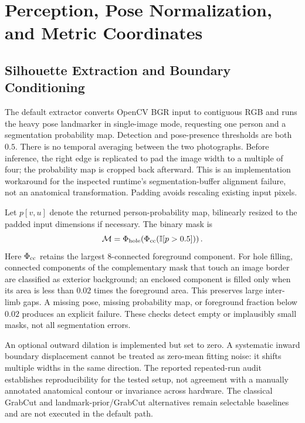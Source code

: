 \documentclass[11pt,a4paper]{article}
\numberwithin{equation}{section}
\begin{document}
\section{Perception, Pose Normalization, and Metric Coordinates}
\subsection{Silhouette Extraction and Boundary Conditioning}
\label{subsec:segmentation}
The default extractor converts OpenCV BGR input to contiguous RGB and runs the heavy pose landmarker in single-image mode, requesting one person and a segmentation probability map. Detection and pose-presence thresholds are both $0.5$. There is no temporal averaging between the two photographs. Before inference, the right edge is replicated to pad the image width to a multiple of four; the probability map is cropped back afterward. This is an implementation workaround for the inspected runtime's segmentation-buffer alignment failure, not an anatomical transformation. Padding avoids rescaling existing input pixels.

Let $p[v,u]$ denote the returned person-probability map, bilinearly resized to the padded input dimensions if necessary. The binary mask is
\begin{equation}
\mathcal M=\Phi_{\rm hole}\!\left(\Phi_{\rm cc}\!\left(\mathbb I[p>0.5]\right)\right).
\label{eq:mask}
\end{equation}
Here $\Phi_{\rm cc}$ retains the largest 8-connected foreground component. For hole filling, connected components of the complementary mask that touch an image border are classified as exterior background; an enclosed component is filled only when its area is less than $0.02$ times the foreground area. This preserves large inter-limb gaps. A missing pose, missing probability map, or foreground fraction below $0.02$ produces an explicit failure. These checks detect empty or implausibly small masks, not all segmentation errors.

An optional outward dilation is implemented but set to zero. A systematic inward boundary displacement cannot be treated as zero-mean fitting noise: it shifts multiple widths in the same direction. The reported repeated-run audit establishes reproducibility for the tested setup, not agreement with a manually annotated anatomical contour or invariance across hardware. The classical GrabCut and landmark-prior/GrabCut alternatives remain selectable baselines and are not executed in the default path.
\end{document}
